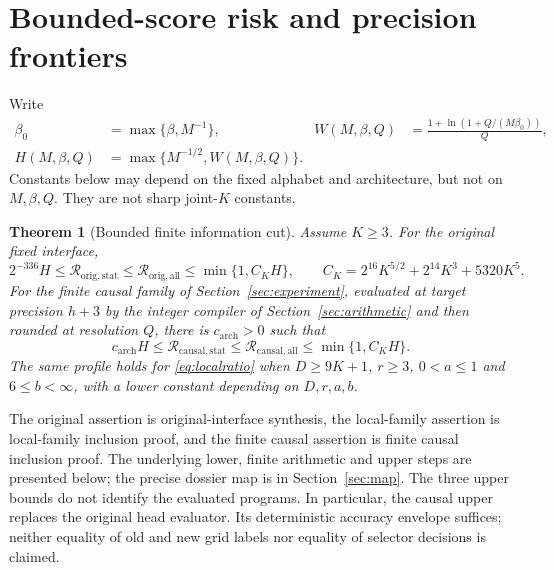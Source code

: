 \documentclass[11pt,letterpaper]{article}
\newtheorem{theorem}{Theorem}[section]
\theoremstyle{definition}\newtheorem{definition}[theorem]{Definition}
\theoremstyle{remark}\newtheorem{remark}[theorem]{Remark}
\newcommand{\betaz}{\beta_0}
\newcommand{\Risk}{\mathcal{R}}
\begin{document}
\section{Bounded-score risk and precision frontiers}\label{sec:main}
Write
\begin{equation}\label{eq:profile}
 \begin{aligned}
 \betaz&=\max\{\beta,M^{-1}\},&
 W(M,\beta,Q)&=\frac{1+\ln(1+Q/(M\betaz))}{Q},\\
 H(M,\beta,Q)&=\max\{M^{-1/2},W(M,\beta,Q)\}.&&
 \end{aligned}
\end{equation}
Constants below may depend on the fixed alphabet and architecture, but not on $M,\beta,Q$. They are not sharp joint-$K$ constants.

\begin{theorem}[Bounded finite information cut]\label{thm:main}
Assume $K\ge3$. For the original fixed interface,
\begin{equation}\label{eq:original}
 2^{-336}H\le\Risk_{\mathrm{orig},\mathrm{stat}}
 \le\Risk_{\mathrm{orig},\mathrm{all}}\le\min\{1,C_KH\},
 \qquad C_K=2^{16}K^{5/2}+2^{14}K^3+5320K^5.
\end{equation}
For the finite causal family of Section~\ref{sec:experiment}, evaluated at target precision $h+3$ by the integer compiler of Section~\ref{sec:arithmetic} and then rounded at resolution $Q$, there is $c_{\mathrm{arch}}>0$ such that
\begin{equation}\label{eq:causalmain}
 c_{\mathrm{arch}}H\le\Risk_{\mathrm{causal},\mathrm{stat}}
 \le\Risk_{\mathrm{causal},\mathrm{all}}\le\min\{1,C_KH\}.
\end{equation}
The same profile holds for \eqref{eq:localratio} when $D\ge9K+1$, $r\ge3$, $0<a\le1$ and $6\le b<\infty$, with a lower constant depending on $D,r,a,b$.
\end{theorem}

The original assertion is original-interface synthesis, the local-family assertion is local-family inclusion proof, and the finite causal assertion is finite causal inclusion proof. The underlying lower, finite arithmetic and upper steps are presented below; the precise dossier map is in Section~\ref{sec:map}. The three upper bounds do not identify the evaluated programs. In particular, the causal upper replaces the original head evaluator. Its deterministic accuracy envelope suffices; neither equality of old and new grid labels nor equality of selector decisions is claimed.
\end{document}

